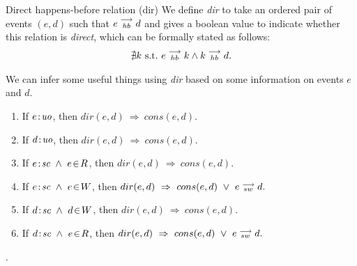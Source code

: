 \begin{definition}{Direct happens-before relation (dir)}
    \label{Dir}
    We define \emph{dir} to take an ordered pair of events $(e,d)$ such that $e\stackrel{\longrightarrow}{_{hb}}d$ and gives a boolean value to indicate whether this relation is \textit{direct}, which can be formally stated as follows:
    \begin{align*}
        \nexists k \ \text{s.t.} \ e\stackrel{\longrightarrow}{_{hb}}k \wedge k\stackrel{\longrightarrow}{_{hb}}d.
    \end{align*}
    
    We can infer some useful things using \emph{dir} based on some information on events $e$ and $d$\footnotemark. 
    \begin{enumerate}
        \item If $e\!:\!\textit{uo}$, then $dir(e,d) \ \Rightarrow \ cons(e,d).$ 
        \item If $d\!:\!\textit{uo}$, then $dir(e,d) \ \Rightarrow \ cons(e,d).$
        \item If $\et{e}{sc}\ \wedge\ e\!\in\!R$, then $dir(e,d) \ \Rightarrow \ cons(e,d).$
        \item If $\et{e}{sc}\ \wedge\ e\!\in\!W$, then $dir(e,d) \ \Rightarrow \ cons(e,d)\ \vee\ \reln{e}{sw}{d}.$
        \item If $\et{d}{sc}\ \wedge\ d\!\in\!W$, then $dir(e,d) \ \Rightarrow \ cons(e,d).$
        \item If $\et{d}{sc}\ \wedge\ e\!\in\!R$, then $dir(e,d) \ \Rightarrow \ cons(e,d)\ \vee\ \reln{e}{sw}{d}.$
    \end{enumerate}

    .
\end{definition}


